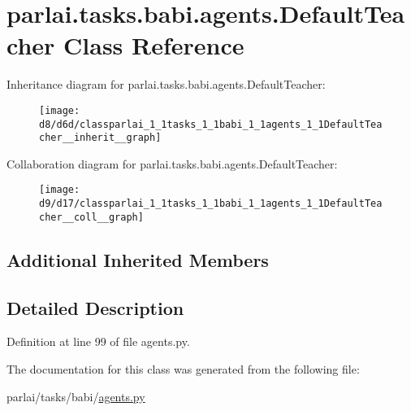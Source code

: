 \hypertarget{classparlai_1_1tasks_1_1babi_1_1agents_1_1DefaultTeacher}{}\section{parlai.\+tasks.\+babi.\+agents.\+Default\+Teacher Class Reference}
\label{classparlai_1_1tasks_1_1babi_1_1agents_1_1DefaultTeacher}


Inheritance diagram for parlai.\+tasks.\+babi.\+agents.\+Default\+Teacher\+:\nopagebreak
\begin{figure}[H]
\begin{center}
\leavevmode
\texttt{[image: d8/d6d/classparlai\_1\_1tasks\_1\_1babi\_1\_1agents\_1\_1DefaultTeacher\_\_inherit\_\_graph]}
\end{center}
\end{figure}


Collaboration diagram for parlai.\+tasks.\+babi.\+agents.\+Default\+Teacher\+:\nopagebreak
\begin{figure}[H]
\begin{center}
\leavevmode
\texttt{[image: d9/d17/classparlai\_1\_1tasks\_1\_1babi\_1\_1agents\_1\_1DefaultTeacher\_\_coll\_\_graph]}
\end{center}
\end{figure}
\subsection*{Additional Inherited Members}


\subsection{Detailed Description}


Definition at line 99 of file agents.\+py.



The documentation for this class was generated from the following file\+:\begin{DoxyCompactItemize}
\item 
parlai/tasks/babi/\hyperlink{parlai_2tasks_2babi_2agents_8py}{agents.\+py}\end{DoxyCompactItemize}
